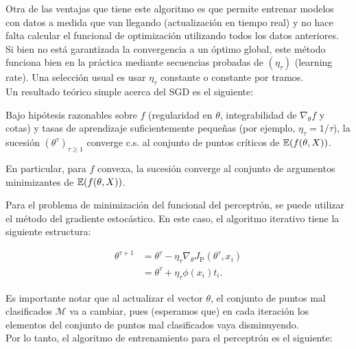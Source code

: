 \begin{mdframed}[style=pendiente, frametitle={\center Método del gradiente estocástico}]
Otra de las ventajas que tiene este algoritmo es que permite entrenar modelos con datos a medida que van llegando (actualización en tiempo real) y no hace falta calcular el funcional de optimización utilizando todos los datos anteriores.\\

Si bien no está garantizada la convergencia a un óptimo global, este método funciona bien en la práctica mediante secuencias probadas de $(\eta_\tau)$ (learning rate). Una selección usual es usar $\eta_\tau$ constante o constante por tramos.\\

Un resultado teórico simple acerca del SGD es el siguiente:


	\begin{theorem} Bajo hipótesis razonables sobre $f$ (regularidad en $\theta$, integrabilidad de $\nabla_\theta f$ y cotas) y tasas de aprendizaje suficientemente pequeñas (por ejemplo, $\eta_\tau = 1/\tau$), la sucesión $(\theta^\tau)_{\tau\geq 1}$ converge c.s. al conjunto de puntos críticos de $\operatorname{\mathbb{E}}(f(\theta,X))$.\\		
	\end{theorem}
	
En particular, para $f$ convexa, la sucesión converge al conjunto de argumentos minimizantes de $\operatorname{\mathbb{E}}(f(\theta,X))$.
	
\end{mdframed}

Para el problema de minimización del funcional del perceptrón, se puede utilizar el método del gradiente estocástico. En este caso, el algoritmo iterativo tiene la siguiente estructura:


\begin{align}
	\theta^{\tau+1} &= \theta^\tau - \eta_\tau \nabla_\theta J_\text{P}(\theta^\tau,x_i)\nonumber\\
	&= \theta^\tau + \eta_\tau \phi(x_i)t_i.\label{eq:percetron_rule}
\end{align}

Es importante notar que al actualizar el vector $\theta$, el conjunto de puntos mal clasificados $\mathcal{M}$ va a cambiar, pues (esperamos que) en cada iteración los elementos del conjunto de puntos mal clasificados vaya disminuyendo.\\

Por lo tanto, el algoritmo de entrenamiento para el perceptrón es el siguiente:

